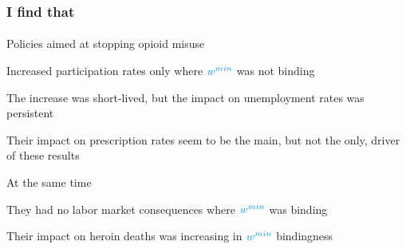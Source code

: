 \begin{frame}

    \frametitle{I find that} %
    \framesubtitle{}  %
    \rmfamily %
    
    \begin{wideitemize}
        \item Policies aimed at stopping opioid misuse
        \vspace{9pt}
        \begin{wideitemize}
            \item[\textcolor{fblu}{\textbullet}] Increased participation rates only where \(\textcolor{fblu}{w^{min}}\) \textcolor{fblu}{was not binding}
            \item[\textcolor{fblu}{\textbullet}] The increase was short-lived, but the impact on unemployment rates was persistent
            \item[\textcolor{fblu}{\textbullet}] Their impact on prescription rates seem to be the main, but not the only, driver of these results
        \end{wideitemize}
        \item At the same time
        \vspace{9pt}
        \begin{wideitemize}
            \item[\textcolor{fblu}{\textbullet}] They had no labor market consequences where \(\textcolor{fblu}{w^{min}}\) \textcolor{fblu}{was binding}
            \item[\textcolor{fblu}{\textbullet}] Their impact on heroin deaths was increasing in \(\textcolor{fblu}{w^{min}}\) bindingness 
        \end{wideitemize}
    \end{wideitemize}
    
\end{frame}

